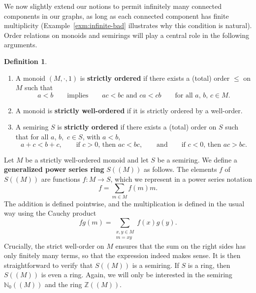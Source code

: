 \documentclass{amsart}
\theoremstyle{plain}
\theoremstyle{definition}
\newtheorem{definition}[thm]{Definition}
\newcommand{\defit}[1]{\textbf{#1}}
\newcommand{\bN}{\mathbb N}
\newcommand{\bZ}{\mathbb Z}
\newcommand{\hmnser}[2]{{#1}(\!({#2})\!)}
\begin{document}
We now slightly extend our notions to permit infinitely many connected components in our graphs, as long as each connected component has finite multiplicity (Example~\ref{exm:infinite-bad} illustrates why this condition is  natural).
Order relations on monoids and semirings will play a central role in the following arguments.

\begin{definition}
  \mbox{}
  \begin{enumerate}
    \item A monoid $(M,\cdot, 1)$ is \defit{strictly ordered} if there exists a \textup(total\textup) order $\le$ on $M$ such that
    \[
    a < b \qquad\text{implies}\qquad ac < bc \text{ and } ca < cb \qquad\text{for all $a$, $b$,~$c \in M$.}
  \]
  \item A monoid is \defit{strictly well-ordered} if it is strictly ordered by a well-order.
  \item A semiring $S$ is \defit{strictly ordered} if there exists a \textup(total\textup) order on $S$ such that for all $a$, $b$,~$c \in S$, with $a < b$,
  \[
  a + c < b + c, \qquad\text{if $c > 0$, then } ac < bc, \qquad\text{and}\qquad\text{if $c < 0$, then } ac > bc.
  \]
  \end{enumerate}
\end{definition}

Let $M$ be a strictly well-ordered monoid and let $S$ be a semiring.
We define a \defit{generalized power series ring} $\hmnser{S}{M}$ as follows.
The elements $f$ of $\hmnser{S}{M}$ are functions $f \colon M \to S$, which we represent in a power series notation
\[
f = \sum_{m \in M} f(m) m.
\]
The addition is defined pointwise, and the multiplication is defined in the usual way using the Cauchy product
\[
fg(m) = \sum_{\substack{x, y \in M \\ m=xy}} f(x)g(y).
\]
Crucially, the strict well-order on $M$ ensures that the sum on the right sides has only finitely many terms, so that the expression indeed makes sense.
It is then straightforward to verify that $\hmnser{S}{M}$ is a semiring.
If $S$ is a ring, then $\hmnser{S}{M}$ is even a ring.
Again, we will only be interested in the semiring $\hmnser{\bN_0}{M}$ and the ring $\hmnser{\bZ}{M}$.
\end{document}
